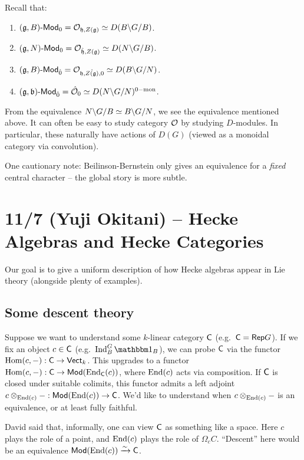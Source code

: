 \documentclass{article}
\begin{document}
Recall that:
\begin{enumerate}
	\item $(\mathfrak{g}, B)\text{-}\mathsf{Mod}_0 = \mathcal{O}_{\mathfrak{h},Z(\mathfrak{g})} \simeq D(B \backslash G / B)$.
	\item $(\mathfrak{g}, N)\text{-}\mathsf{Mod}_0 = \mathcal{O}_{\hat{\mathfrak{h}},Z(\mathfrak{g})} \simeq D(N \backslash G / B)$.
	\item $(\mathfrak{g}, B)\text{-}\mathsf{Mod}_{\hat{0}} = \mathcal{O}_{\mathfrak{h},\hat{Z(\mathfrak{g})},0} \simeq D(B \backslash G / N)$.
	\item $(\mathfrak{g}, \mathfrak{b})\text{-}\mathsf{Mod}_{\hat{0}} = \hat{\mathcal{O}}_0 \simeq D(N \backslash G / N)^{0\mathrm{-mon}}$.
\end{enumerate}

From the equivalence $N \backslash G / B \simeq B \backslash G / N$, we see the equivalence mentioned above.
It can often be easy to study category $\mathcal{O}$ by studying $D$-modules.
In particular, these naturally have actions of $D(G)$ (viewed as a monoidal category via convolution).

One cautionary note: Beilinson-Bernstein only gives an equivalence for a \emph{fixed} central character -- the global story is more subtle.

\section{11/7 (Yuji Okitani) -- Hecke Algebras and Hecke Categories}

Our goal is to give a uniform description of how Hecke algebras appear in Lie theory (alongside plenty of examples).

\subsection{Some descent theory}

Suppose we want to understand some $k$-linear category $\mathsf{C}$ (e.g.\ $\mathsf{C} = \mathsf{Rep} G$).
If we fix an object $c \in \mathsf{C}$ (e.g.\ $\Indop_B^G \onebb_B$), we can probe $\mathsf{C}$ via the functor $\operatorname{Hom}(c, -): \mathsf{C} \to \mathsf{Vect}_k$.
This upgrades to a functor $\operatorname{Hom}(c, -): \mathsf{C} \to \mathsf{Mod}(\operatorname{End}_{\mathsf{C}}(c))$, where $\operatorname{End}(c)$ acts via composition.
If $\mathsf{C}$ is closed under suitable colimits, this functor admits a left adjoint $c \otimes_{\operatorname{End}(c)} -: \mathsf{Mod}(\operatorname{End}(c)) \to \mathsf{C}$.
We'd like to understand when $c \otimes_{\operatorname{End}(c)} -$ is an equivalence, or at least fully faithful.

\begin{rmk}
	David said that, informally, one can view $\mathsf{C}$ as something like a space.
	Here $c$ plays the role of a point, and $\operatorname{End}(c)$ plays the role of $\Omega_c C$.
	``Descent'' here would be an equivalence $\mathsf{Mod}(\operatorname{End}(c)) \xrightarrow{\sim} \mathsf{C}$.
\end{rmk}
\end{document}
